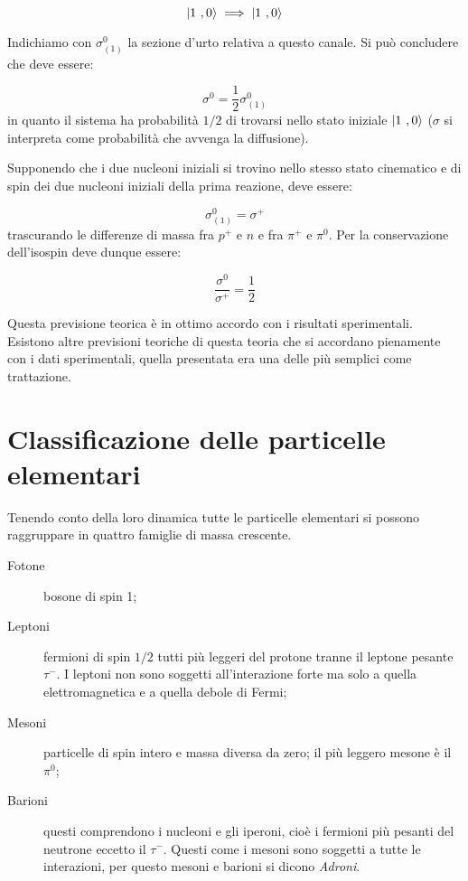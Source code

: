 \begin{equation*}
\Ket{1 \ , 0} \implies \Ket{ 1 \ , 0}
\end{equation*}

Indichiamo con $\sigma^0_{(1)}$ la sezione d'urto relativa a questo canale. Si
può concludere che deve essere:

\begin{equation*}
\sigma^0 = \dfrac{1}{2} \sigma^0_{(1)}
\end{equation*}
in quanto il sistema ha probabilità $1/2$ di trovarsi nello stato iniziale
$\Ket{1 \ ,0}$ ($\sigma$ si interpreta come probabilità che avvenga la
diffusione).

Supponendo che i due nucleoni iniziali si trovino nello stesso stato cinematico
e di spin dei due nucleoni iniziali della prima reazione, deve essere:

\begin{equation*}
\sigma^0_{(1)} = \sigma^+
\end{equation*}
trascurando le differenze di massa fra $p^+$ e $n$ e fra $\pi^+$ e $\pi^0$. Per
la conservazione dell'isospin deve dunque essere:

\begin{equation*}
\dfrac{\sigma^0}{\sigma^+} = \dfrac{1}{2}
\end{equation*}

Questa previsione teorica è in ottimo accordo con i risultati sperimentali. 
Esistono altre previsioni teoriche di questa teoria che si accordano pienamente
con i dati sperimentali, quella presentata era una delle più semplici come
trattazione. 

\chapter{Classificazione delle particelle elementari}

Tenendo conto della loro dinamica tutte le particelle elementari si possono
raggruppare in quattro famiglie di massa crescente.

\begin{description}
 \item[Fotone] bosone di spin 1;
 \item[Leptoni] fermioni di spin $1/2$ tutti più leggeri del protone tranne il
   leptone pesante $\tau^-$. I leptoni non sono soggetti all'interazione forte
   ma solo a quella elettromagnetica e a quella debole di Fermi;
 \item[Mesoni] particelle di spin intero e massa diversa da zero; il più leggero
   mesone è il $\pi^0$;
 \item[Barioni] questi comprendono i nucleoni e gli iperoni, cioè i fermioni più
   pesanti del neutrone eccetto il $\tau^-$. Questi come i mesoni sono soggetti
   a tutte le interazioni, per questo mesoni e barioni si dicono
   \textit{Adroni}.
\end{description}

